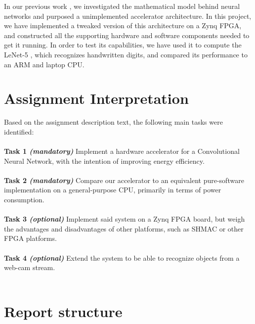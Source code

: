 In our previous work \cite{Halvorsen2014}, we investigated the mathematical model behind neural networks and purposed a unimplemented accelerator architecture. In this project, we have implemented a tweaked version of this architecture on a Zynq FPGA, and constructed all the supporting hardware and software components needed to get it running. In order to test its capabilities, we have used it to compute the LeNet-5 \cite{LeCun1998}, which recognizes handwritten digits, and compared its performance to an ARM and laptop CPU.


\section{Assignment Interpretation}

Based on the assignment description text, the following main tasks were
identified:\\ \hfil \\ \hfil
\textbf{Task 1 \textit{(mandatory)}} Implement a hardware accelerator for a Convolutional Neural Network, with the intention of improving energy efficiency.  \\ \hfil \\ \hfil
\textbf{Task 2 \textit{(mandatory)}} Compare our accelerator to an equivalent pure-software implementation on a general-purpose CPU, primarily in terms of power consumption.  \\ \hfil \\ \hfil
\textbf{Task 3 \textit{(optional)}} Implement said system on a  Zynq FPGA board, but weigh the advantages and disadvantages of other platforms, such as SHMAC or other FPGA platforms. \\ \hfil \\ \hfil
\textbf{Task 4 \textit{(optional)}} Extend the system to be able to recognize objects from a web-cam stream. \\ \hfil \\ \hfil


\section{Report structure}

